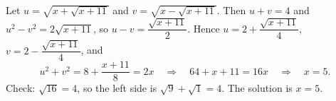 Let $u=\sqrt{x+\sqrt{x+11}}$ and $v=\sqrt{x-\sqrt{x+11}}$. Then $u+v=4$ and $u^2-v^2=2\sqrt{x+11}$, so $u-v=\dfrac{\sqrt{x+11}}{2}$. Hence $u=2+\dfrac{\sqrt{x+11}}{4}$, $v=2-\dfrac{\sqrt{x+11}}{4}$, and
\[
u^2+v^2=8+\dfrac{x+11}{8}=2x\quad\Longrightarrow\quad64+x+11=16x\quad\Longrightarrow\quad x=5 .
\]
Check: $\sqrt{16}=4$, so the left side is $\sqrt9+\sqrt1=4$. The solution is $\boxed{x=5}$.
